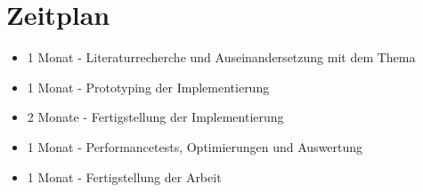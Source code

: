 \section{Zeitplan}

\begin{itemize}
\item 1 Monat - Literaturrecherche und Auseinandersetzung mit dem Thema
\item 1 Monat - Prototyping der Implementierung
\item 2 Monate - Fertigstellung der Implementierung
\item 1 Monat - Performancetests, Optimierungen und Auswertung
\item 1 Monat - Fertigstellung der Arbeit
\end{itemize}